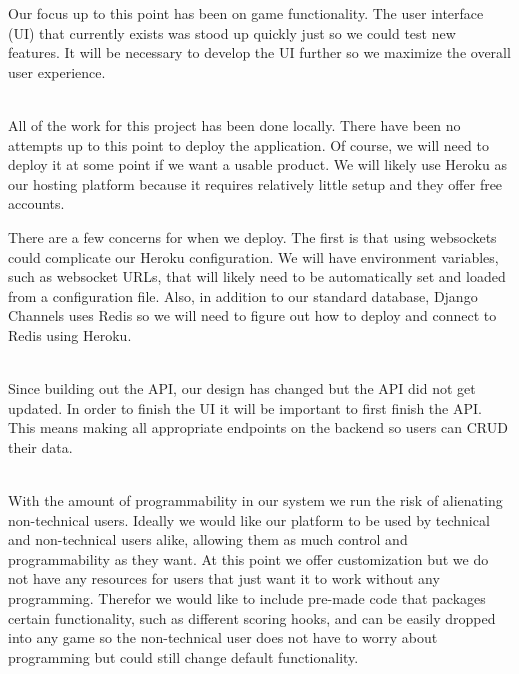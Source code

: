 \documentclass{article}
\begin{document}
    Our focus up to this point has been on game functionality. The user interface (UI) that currently exists was stood up quickly just so we could test new features. It will be necessary to develop the UI further so we maximize the overall user experience.
    \\\\
    \smallskip

    All of the work for this project has been done locally. There have been no attempts up to this point to deploy the application. Of course, we will need to deploy it at some point if we want a usable product. We will likely use Heroku as our hosting platform because it requires relatively little setup and they offer free accounts.
    \smallskip
    
    There are a few concerns for when we deploy. The first is that using websockets could complicate our Heroku configuration. We will have environment variables, such as websocket URLs, that will likely need to be automatically set and loaded from a configuration file. Also, in addition to our standard database, Django Channels uses Redis so we will need to figure out how to deploy and connect to Redis using Heroku. 
    \\\\
    \smallskip
    
    Since building out the API, our design has changed but the API did not get updated. In order to finish the UI it will be important to first finish the API. This means making all appropriate endpoints on the backend so users can CRUD their data. 
    \\\\
    \smallskip
    
    With the amount of programmability in our system we run the risk of alienating non-technical users. Ideally we would like our platform to be used by technical and non-technical users alike, allowing them as much control and programmability as they want. At this point we offer customization but we do not have any resources for users that just want it to work without any programming. Therefor we would like to include pre-made code that packages certain functionality, such as different scoring hooks, and can be easily dropped into any game so the non-technical user does not have to worry about programming but could still change default functionality.
    \\\\
    \smallskip
    
\end{document}
